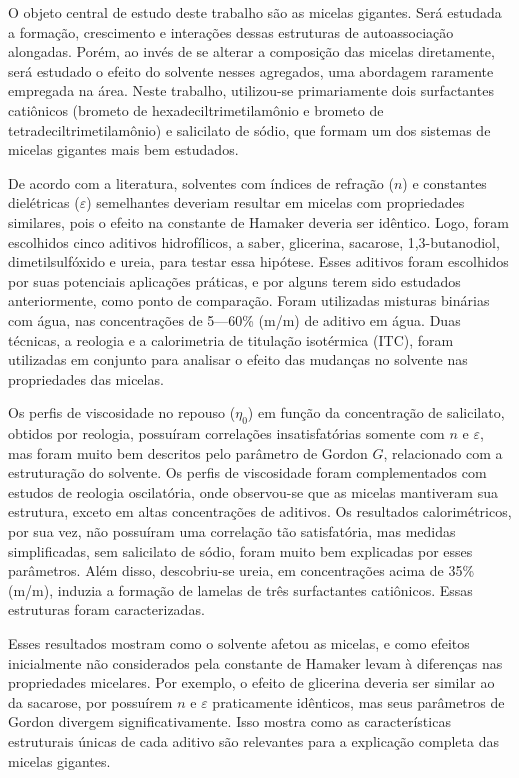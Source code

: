 \documentclass[
	12pt,				%
	openright,			%
	twoside,			%
	a4paper,			%
	english,			%
	brazil%
	]{abntex2}
\begin{document}
\setlength{\absparsep}{18pt} %
\begin{resumo}
 	O objeto central de estudo deste trabalho são as micelas gigantes. Será estudada a formação, crescimento e interações dessas estruturas de autoassociação alongadas. Porém, ao invés de se alterar a composição das micelas diretamente, será estudado o efeito do solvente nesses agregados, uma abordagem raramente empregada na área. Neste trabalho, utilizou-se primariamente dois surfactantes catiônicos (brometo de hexadeciltrimetilamônio e brometo de tetradeciltrimetilamônio) e salicilato de sódio, que formam um dos sistemas de micelas gigantes mais bem estudados.
 	
	De acordo com a literatura, solventes com índices de refração (\(n\)) e constantes dielétricas (\(\varepsilon\)) semelhantes deveriam resultar em micelas com propriedades similares, pois o efeito na constante de Hamaker deveria ser idêntico. Logo, foram escolhidos cinco aditivos hidrofílicos, a saber, glicerina, sacarose, 1,3-butanodiol, dimetilsulfóxido e ureia, para testar essa hipótese. Esses aditivos foram escolhidos por suas potenciais aplicações práticas, e por alguns terem sido estudados anteriormente, como ponto de comparação. Foram utilizadas misturas binárias com água, nas concentrações de 5---60\% (m/m) de aditivo em água. Duas técnicas, a reologia e a calorimetria de titulação isotérmica (ITC), foram utilizadas em conjunto para analisar o efeito das mudanças no solvente nas propriedades das micelas. 
	
	Os perfis de viscosidade no repouso (\(\eta_0\)) em função da concentração de salicilato, obtidos por reologia, possuíram correlações insatisfatórias somente com \(n\) e \(\varepsilon\), mas foram muito bem descritos pelo parâmetro de Gordon \(G\), relacionado com a estruturação do solvente. Os perfis de viscosidade foram complementados com estudos de reologia oscilatória, onde observou-se que as micelas mantiveram sua estrutura, exceto em altas concentrações de aditivos. Os resultados calorimétricos, por sua vez, não possuíram uma correlação tão satisfatória, mas medidas simplificadas, sem salicilato de sódio, foram muito bem explicadas por esses parâmetros. Além disso, descobriu-se ureia, em concentrações acima de 35\% (m/m), induzia a formação de lamelas de três surfactantes catiônicos. Essas estruturas foram caracterizadas.
	
	Esses resultados mostram como o solvente afetou as micelas, e como efeitos inicialmente não considerados pela constante de Hamaker levam à diferenças nas propriedades micelares. Por exemplo, o efeito de glicerina deveria ser similar ao da sacarose, por possuírem \(n\) e \(\varepsilon\) praticamente idênticos, mas seus parâmetros de Gordon divergem significativamente. Isso mostra como as características estruturais únicas de cada aditivo são relevantes para a explicação completa das micelas gigantes.
	

\end{resumo}
\end{document}
